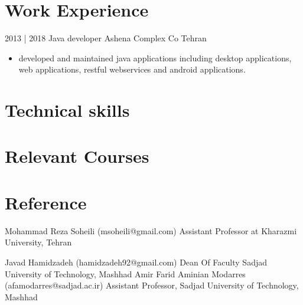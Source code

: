 \documentclass[a4paper]{moderncv}        %
\begin{document}
\vspace*{-0.5\baselineskip}
\section{Work Experience}
\cventry
{2013 | 2018}
{Java developer}
{Ashena Complex Co}
{Tehran}
{}
{\begin{itemize}%
	\item developed and maintained java applications including desktop applications, web applications, restful webservices and android applications.
	\end{itemize}}
	
\vspace*{-0.5\baselineskip}
\section{Technical skills}

\vspace*{-0.5\baselineskip}
\section{Relevant Courses}

\vspace*{-0.5\baselineskip}
\section{Reference}

\cventry
{}
{Mohammad Reza Soheili}
{(msoheili@gmail.com)}
{}
{}
{Assistant Professor at Kharazmi University, Tehran}


\cventry
{}
{Javad Hamidzadeh}
{(hamidzadeh92@gmail.com)}
{}
{}
{Dean Of Faculty Sadjad University of Technology, Mashhad}
\cventry
{}
{Amir Farid Aminian Modarres}
{(afamodarres@sadjad.ac.ir)}
{}
{}
{Assistant Professor, Sadjad University of Technology, Mashhad}
\end{document}
